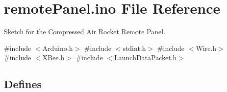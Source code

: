 \hypertarget{remotePanel_8ino}{\section{remote\-Panel.\-ino \-File \-Reference}
\label{remotePanel_8ino}
}


\-Sketch for the \-Compressed \-Air \-Rocket \-Remote \-Panel.  


{\ttfamily \#include $<$\-Arduino.\-h$>$}\*
{\ttfamily \#include $<$stdint.\-h$>$}\*
{\ttfamily \#include $<$\-Wire.\-h$>$}\*
{\ttfamily \#include $<$\-X\-Bee.\-h$>$}\*
{\ttfamily \#include $<$\-Launch\-Data\-Packet.\-h$>$}\*
\subsection*{\-Defines}
